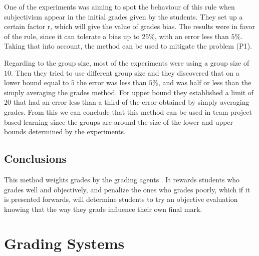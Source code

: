 One of the experiments was aiming to spot the behaviour of this rule when subjectivism appear in the initial grades given by the students. They set up a certain factor r, which will give the value of grades bias. The results were in favor of the rule, since it can tolerate a bias up to $25\%$, with an error less than $5\%$. Taking that into account, the method can be used to mitigate the problem (P1).

Regarding to the group size, most of the experiments were using a group size of $10$. Then they tried to use different group size and they discovered that on a lower bound equal to $5$ the error was less than $5\%$, and was half or less than the simply averaging the grades method. For upper bound they established a limit of $20$ that had an error less than a third of the error obtained by simply averaging grades. From this we can conclude that this method can be used in team project based learning since the groups are around the size of the lower and upper bounds determined by the experiments.

\subsection{Conclusions}
This method weights grades by the grading agents \cite{walsh}. It rewards students who grades well and objectively, and penalize the ones who grades poorly, which if it is presented forwards, will determine students to try an objective evaluation knowing that the way they grade influence their own final mark.

\section{Grading Systems}

